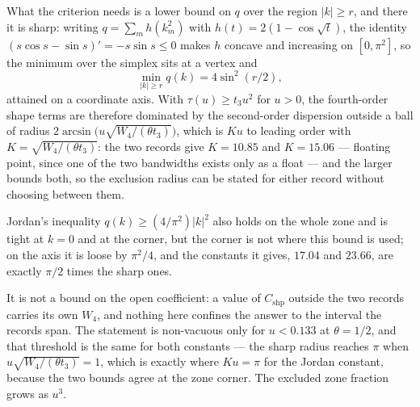 \documentclass[11pt]{article}
\theoremstyle{plain}
\theoremstyle{definition}
\theoremstyle{remark}
\newcommand{\chk}[1]{}
\begin{document}
What the criterion needs is a lower bound on $q$ over the region $|k|\ge r$,
and there it is sharp: writing $q=\sum_m h(k_m^2)$ with
$h(t)=2(1-\cos\sqrt t)$, the identity $(s\cos s-\sin s)'=-s\sin s\le0$ makes
$h$ concave and increasing on $[0,\pi^2]$, so the minimum over the simplex sits
at a vertex and
\begin{equation}\label{eq:qmin}
  \min_{|k|\ge r}q(k)=4\sin^2(r/2),
\end{equation}
attained on a coordinate axis. With $\tau(u)\ge t_3u^2$ for $u>0$, the
fourth-order shape terms are therefore dominated by the second-order dispersion
outside a ball of radius
$2\arcsin\bigl(u\sqrt{W_4/(\theta t_3)}\bigr)$, which is $Ku$ to leading order
with $K=\sqrt{W_4/(\theta t_3)}$: the two records give $K=10.85$ and
$K=15.06$ --- floating point, since one of the two bandwidths exists only as a
float --- and the larger bounds both, so the exclusion radius can be stated for
either record without choosing between them.

Jordan's inequality $q(k)\ge(4/\pi^2)|k|^2$ also holds on the whole zone and is
tight at $k=0$ and at the corner, but the corner is not where this bound is
used; on the axis it is loose by $\pi^2/4$, and the constants it gives,
$17.04$ and $23.66$, are exactly $\pi/2$ times the sharp ones.

It is not a bound on the open coefficient: a value of $C_{\mathrm{shp}}$
outside the two records carries its own $W_4$, and nothing here confines the
answer to the interval the records span. The statement is non-vacuous only for
$u<0.133$ at $\theta=1/2$, and that threshold is the same for both constants
--- the sharp radius reaches $\pi$ when $u\sqrt{W_4/(\theta t_3)}=1$, which is
exactly where $Ku=\pi$ for the Jordan constant, because the two bounds agree at
the zone corner. The excluded zone fraction grows as $u^3$.
\chk{Jordan bound q(k) >= (4/pi\^{}2)|k|\^{}2 holds on the whole zone}
\chk{the exact zone minimum of q on |k| >= r is 4 sin\^{}2(r/2), and Jordan overstates it by pi/2}
\chk{the criterion survives C2: K depends on the kernel only through sqrt(W\_4)}
\chk{the statement is non-vacuous only below an explicit coupling}
\end{document}
